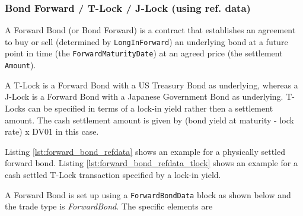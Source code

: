 \subsubsection{Bond Forward / T-Lock / J-Lock (using ref. data)}
\label{ss:BondForward_refdata}

A Forward Bond (or Bond Forward) is a contract that establishes an agreement to buy or sell (determined by
\lstinline!LongInForward!) an underlying bond at a future point in time (the {\tt ForwardMaturityDate}) at an agreed
price (the settlement {\tt Amount}).

A T-Lock is a Forward Bond with a US Treasury Bond as underlying, whereas a J-Lock is a Forward Bond with a Japanese
Government Bond as underlying. T-Locks can be specified in terms of a lock-in yield rather then a settlement
amount. The cash settlement amount is given by (bond yield at maturity - lock rate) x DV01 in this case.

Listing \ref{lst:forward_bond_refdata} shows an example for a physically settled forward bond. Listing
\ref{lst:forward_bond_refdata_tlock} shows an example for a cash settled T-Lock transaction specified by a lock-in yield.

A Forward Bond is set up using a {\tt ForwardBondData} block as shown below and the trade type is
\emph{ForwardBond}. The specific elements are

